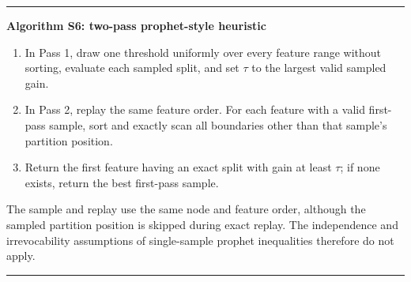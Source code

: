 \documentclass[final,5p,times,twocolumn]{elsarticle}
\newenvironment{suppalgorithm}[1]{%
  \par\medskip\noindent\begin{minipage}{\columnwidth}\small
  \hrule\smallskip\textbf{#1}\par\smallskip
}{%
  \smallskip\hrule\end{minipage}\par\medskip
}
\begin{document}
\begin{suppalgorithm}{Algorithm S6: two-pass prophet-style heuristic}
\begin{enumerate}
\setlength{\itemsep}{0pt}
\item In Pass 1, draw one threshold uniformly over every feature range without
      sorting, evaluate each sampled split, and set \(\tau\) to the largest
      valid sampled gain.
\item In Pass 2, replay the same feature order.  For each feature with a valid
      first-pass sample, sort and exactly scan all boundaries other than that
      sample's partition position.
\item Return the first feature having an exact split with gain at least
      \(\tau\); if none exists, return the best first-pass sample.
\end{enumerate}
The sample and replay use the same node and feature order, although the sampled
partition position is skipped during exact replay.  The
independence and irrevocability assumptions of single-sample prophet
inequalities therefore do not apply.
\end{suppalgorithm}
\end{document}
